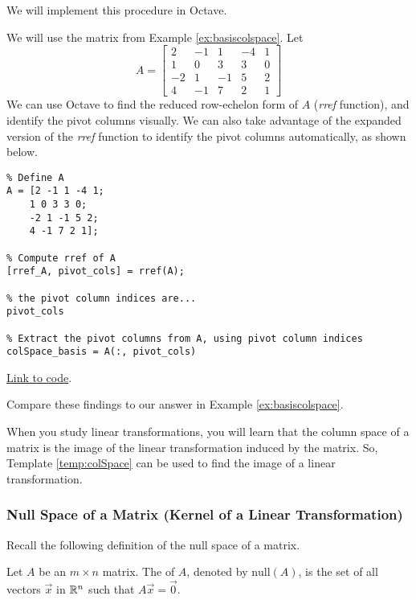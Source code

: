 \documentclass{ximera}
\begin{document}
We will implement this procedure in Octave.

\begin{template}\label{temp:colSpace}
We will use the matrix from Example \ref{ex:basiscolspace}.  Let $$A=\begin{bmatrix}2&-1&1&-4&1\\1&0&3&3&0\\-2&1&-1&5&2\\4&-1&7&2&1\end{bmatrix}$$
We can use Octave to find the reduced row-echelon form of $A$ (\emph{rref} function), and identify the pivot columns visually.  We can also take advantage of the expanded version of the \emph{rref} function to identify the pivot columns automatically, as shown below.

\begin{verbatim}
% Define A
A = [2 -1 1 -4 1;
    1 0 3 3 0;
    -2 1 -1 5 2;
    4 -1 7 2 1];

% Compute rref of A
[rref_A, pivot_cols] = rref(A);

% the pivot column indices are...
pivot_cols

% Extract the pivot columns from A, using pivot column indices
colSpace_basis = A(:, pivot_cols)
\end{verbatim}

\href{https://sagecell.sagemath.org/?z=eJxtTkEKwjAQvAfyh7kULNhiqiIoHoL6Ao9SSq2JBmxTklR8vhssKOjuZWeGmdkEe6VNpyA5k9jiVCATEMgWEBvOQCMww5x2NuKsiLrAEsXILCJcgfiSGM4S7GzbD0HBOaVhdUw_xbuSU_TmYUPV2LsvqTCyE5mOvnBTbx2kD20H011Mozxqp_I85-xjfhsOz-DqJvwYPbSzLahu8Ka7_g3ljPCxrxtVnWtvPH0jJ-vvB9MX3FlRVA==&lang=octave&interacts=eJyLjgUAARUAuQ==}{Link to code}.

Compare these findings to our answer in Example \ref{ex:basiscolspace}.
\end{template}  

When you study linear transformations, you will learn that the column space of a matrix is the image of the linear transformation induced by the matrix.  So, Template \ref{temp:colSpace} can be used to find the image of a linear transformation.

\subsubsection*{Null Space of a Matrix (Kernel of a Linear Transformation)}

Recall the following definition of the null space of a matrix.
\begin{definition}[\ref{def:nullspace}] Let $A$ be an $m\times n$ matrix.  The  of $A$, denoted by $\mbox{null}(A)$, is the set of all vectors $\vec{x}$ in $\mathbb{R}^n$ such that $A\vec{x}=\vec{0}$.
\end{definition}
\end{document}
